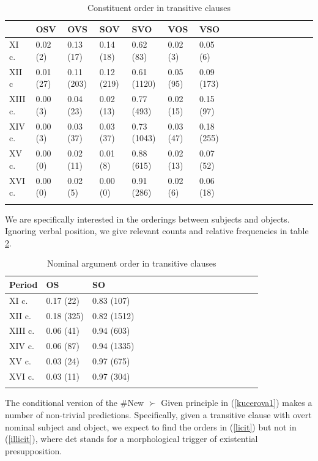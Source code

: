 \documentclass[output=paper,modfonts,nonflat]{langsci/langscibook}
\begin{document}
\begin{table}[H]
\centering
\begin{tabular}{lllllllllllllllll}
  \lsptoprule
 & OSV & OVS & SOV & SVO & VOS & VSO \\ 
  \midrule
XI c. &  0.02 (2) & 0.13 (17) & 0.14 (18) & 0.62 (83) & 0.02 (3) & 0.05 (6) \\ 
  XII c & 0.01 (27) & 0.11 (203) & 0.12 (219) & 0.61 (1120) &  0.05 (95) & 0.09 (173) \\ 
  XIII c. &  0.00 (3) & 0.04 (23) & 0.02 (13) & 0.77 (493) & 0.02 (15) & 0.15 (97) \\ 
  XIV c. &  0.00 (3)  &  0.03 (37) & 0.03 (37) & 0.73 (1043) & 0.03 (47) &0.18 (255) \\ 
  XV c. &  0.00 (0) &  0.02 (11)  &  0.01 (8) & 0.88 (615) & 0.02 (13) & 0.07 (52) \\ 
  XVI c. &  0.00 (0) &  0.02 (5) & 0.00 (0) & 0.91 (286) &  0.02 (6) & 0.06 (18) \\ 
\lspbottomrule
\end{tabular}
\caption{Constituent order in transitive clauses}\label{table:orders}
\end{table}

We are specifically interested in the orderings between subjects and objects. Ignoring verbal position, we give relevant counts and relative frequencies in table \ref{table:orders2}.

\begin{table}[H]
\centering
\begin{tabular}{lllllllllllllllll}
  \lsptoprule
Period & OS & SO  \\ 
  \midrule
XI c. &  0.17 (22) & 0.83 (107) \\ 
XII c. & 0.18 (325) & 0.82 (1512) \\ 
XIII c. & 0.06 (41)  & 0.94 (603) \\ 
XIV c. & 0.06 (87) & 0.94 (1335) \\ 
XV c. & 0.03 (24) & 0.97 (675) \\ 
XVI c. & 0.03 (11) & 0.97 (304) \\ 
\lspbottomrule
\end{tabular}
\caption{Nominal argument order in transitive clauses}\label{table:orders2}
\end{table}

The conditional version of the \#New $\succ$ Given principle in (\ref{kucerova1}) makes a number of non-trivial predictions. Specifically, given a transitive clause with overt nominal subject and object, we expect to find the orders in (\ref{licit}) but not in (\ref{illicit}), where {\sc det} stands for a morphological trigger of existential presupposition.
\end{document}
